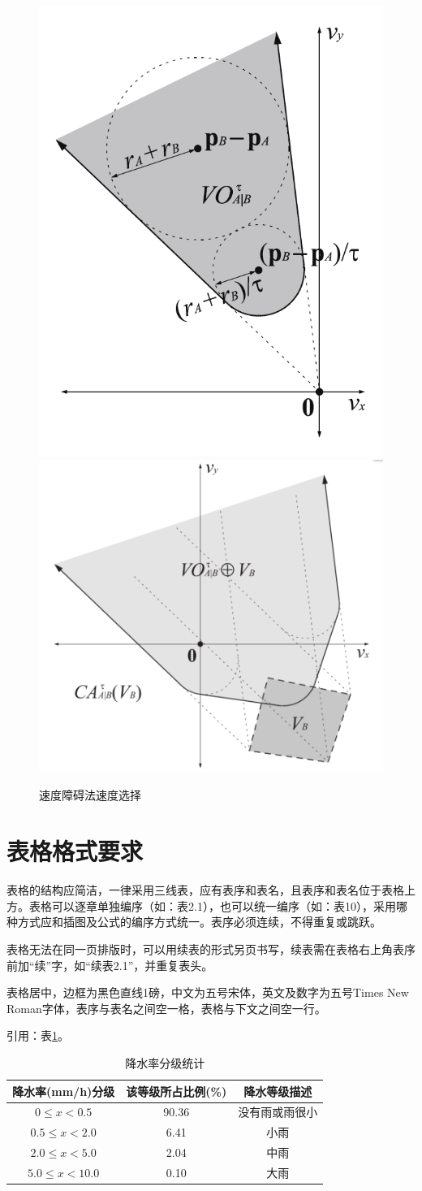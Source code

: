 \documentclass{seuthesis-2019}
\begin{document}
\begin{figure}[H]
    \centering
      {\includegraphics[width=0.3\linewidth]{fig/速度障碍集合.png}}
      {\includegraphics[width=0.4\linewidth]{fig/避免碰撞集合.png}}
    \caption{速度障碍法速度选择}
    \label{fig:2}
\end{figure}

\section{表格格式要求}
表格的结构应简洁，一律采用三线表，应有表序和表名，且表序和表名位于表格上方。表格可以逐章单独编序（如：表2.1），也可以统一编序（如：表10），采用哪种方式应和插图及公式的编序方式统一。表序必须连续，不得重复或跳跃。

表格无法在同一页排版时，可以用续表的形式另页书写，续表需在表格右上角表序前加“续”字，如“续表2.1”，并重复表头。

表格居中，边框为黑色直线1磅，中文为五号宋体，英文及数字为五号Times New Roman字体，表序与表名之间空一格，表格与下文之间空一行。

引用：表\ref{tab:1}。

\begin{table}
  \centering
  \caption{降水率分级统计}
  \label{tab:1}
  \begin{tabular}{ccc}
    \toprule
    降水率(mm/h)分级 & 该等级所占比例(\%) & 降水等级描述\\
    \midrule
    $0\le x< 0.5$ & 90.36 & 没有雨或雨很小\\
    $0.5\le x< 2.0$ & 6.41 & 小雨\\
    $2.0\le x< 5.0$ & 2.04 & 中雨\\
    $5.0\le x< 10.0$ & 0.10 & 大雨\\
    \bottomrule
  \end{tabular}
\end{table}
\end{document}
